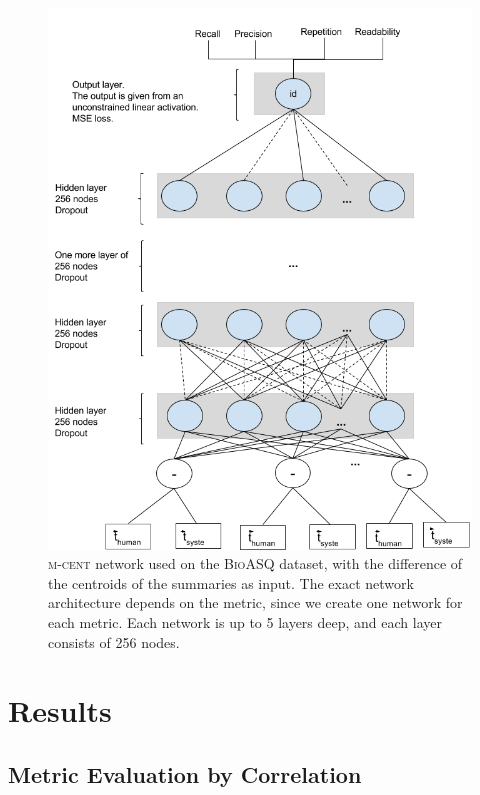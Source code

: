 \documentclass[11pt,a4paper]{article}
\newcommand{\bioasq}{\textsc{BioASQ}\xspace}
\begin{document}
\begin{figure}[ht]
{
\centering
\includegraphics[scale=0.35]{../../my_diagrams/BioASQ_networks/BioASQ_m-cent.png}
\caption{\textsc{m-cent} network used on the \bioasq dataset, with the difference of the centroids of the summaries as input. The exact network architecture depends on the metric, since we create one network for each metric. Each network is up to 5 layers deep, and each layer consists of 256 nodes.}
\label{fig:bioasq-m-cent}
}
\end{figure}


\section{Results}
\label{sec:results}

\subsection{Metric Evaluation by Correlation}
\label{ssec:correlation}
\end{document}

